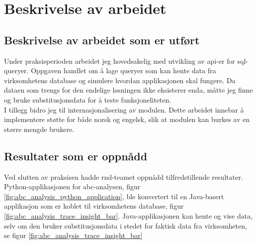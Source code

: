 \section{Beskrivelse av arbeidet}

\subsection{Beskrivelse av arbeidet som er utført}



Under praksisperioden arbeidet jeg hovedsakelig med utvikling av \gls{api}-er for \gls{sql}-queryer. Oppgaven handlet om å lage queryer som kan hente data fra virksomhetens database og simulere hvordan applikasjonen skal fungere. Da dataen som trengs for den endelige løsningen ikke eksisterer enda, måtte jeg finne og bruke substitusjonsdata for å teste funksjoneliteten.\\
I tillegg bidro jeg til internasjonalisering av modulen. Dette arbeidet innebar å implementere støtte for både norsk og engelsk, slik at modulen kan burkes av en større mengde brukere.

\subsection{Resultater som er oppnådd}


Ved slutten av praksisen hadde \gls{rnd}-teamet oppnådd tilfredstillende resultater. Python-applikasjonen for \gls{abc}-analysen, figur \ref{fig:abc_analysis_python_application}, ble konvertert til en Java-basert applikasjon som er koblet til virksomhetens database, figur \ref{fig:abc_analysis_trace_insight_bar}. Java-applikasjonen kan hente og vise data, selv om den bruker substitusjonsdata i stedet for faktisk data fra virksomheten, se figur \ref{fig:abc_analysis_trace_insight_bar}

